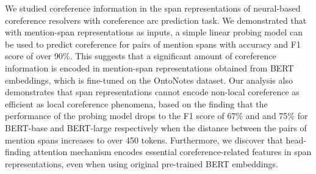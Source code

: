 \documentclass[11pt]{article}
\begin{document}
\begin{itemize}
 

\end{itemize}


We studied coreference information in the span representations of neural-based coreference resolvers with coreference arc prediction task. We demonstrated that with mention-span representations as inputs, a simple linear probing model can be used to predict coreference for pairs of mention spans with accuracy and F1 score of over 90\%. This suggests that a significant amount of coreference information is encoded in mention-span representations obtained from BERT embeddings, which is fine-tuned on the OntoNotes dataset. Our analysis also demonstrates that span representations cannot encode non-local coreference as efficient as local coreference phenomena, based on the finding that the performance of the probing model drops to the F1 score of 67\% and and 75\% for BERT-base and BERT-large respectively when the distance between the pairs of mention spans increases to over 450 tokens. Furthermore, we discover that head-finding attention mechanism encodes essential coreference-related features in span representations, even when using original pre-trained BERT embeddings.
\end{document}
